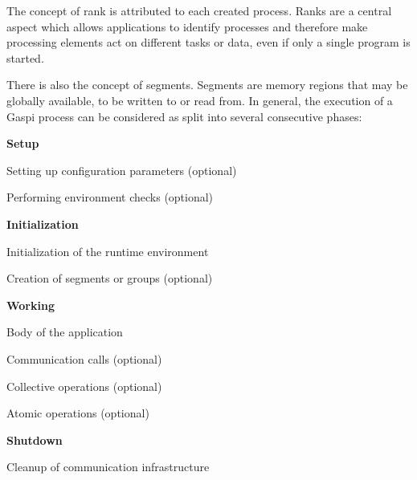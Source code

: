 \documentclass[a4paper]{article}
\newlength{\st}\setlength{\st}{0pt}
\newcommand{\GASPI}{{\sc Gaspi}}
\begin{document}
The concept of rank is attributed to each created process. Ranks are a
central aspect which allows applications to identify processes and
therefore make processing elements act on different tasks or data,
even if only a single program is started.

There is also the concept of segments. Segments are memory regions
that may be globally available, to be written to or read from. In general,
the execution of a \GASPI{} process can be considered as split
into several consecutive phases:

\begin{itemize}
\item \textbf{Setup}
  \begin{description}
  \item Setting up configuration parameters (optional)
  \item Performing environment checks (optional)
  \end{description}
\item \textbf{Initialization}
  \begin{description}
  \item Initialization of the runtime environment
   \item Creation of segments or groups (optional)
  \end{description}
\item \textbf{Working}
  \begin{description}
   \item Body of the application
  \begin{description}
    \item Communication calls (optional)
    \item Collective operations (optional)
    \item Atomic operations (optional)
  \end{description}
  \end{description}
\item \textbf{Shutdown}
  \begin{description}
  \item Cleanup of communication infrastructure
  \end{description}
\end{itemize}
\end{document}
